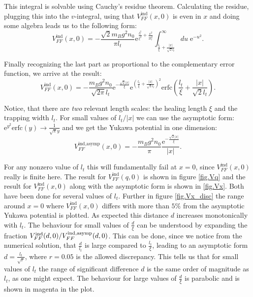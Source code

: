 This integral is solvable using Cauchy's residue theorem. Calculating the residue, plugging this into the $v$-integral, using that $V_{FF}^\text{ind}(x,0)$ is even in $x$ and doing some algebra leads us to the following form:
\begin{equation}
V_{FF}^\text{ind}(x,0) = -\frac{\sqrt{2}m_Bg^2n_0}{\pi l_t}\text{e}^{\frac{l_t^2}{\xi^2}+\frac{x^2}{2l_t^2}}\int_{\frac{l_t}{\xi}+\frac{|x|}{\sqrt{2}l_t}}^\infty du \; \text{e}^{-u^2}. \nonumber
\end{equation}

Finally recognizing the last part as proportional to the complementary error function, we arrive at the result:
\begin{equation}
V_{FF}^\text{ind}(x,0) = -\frac{m_Bg^2n_0}{\sqrt{2\pi} l_t} \text{e}^{-\frac{\sqrt{2}|x|}{\xi}}\text{e}^{\left(\frac{l_t}{\xi}+\frac{|x|}{\sqrt{2}l_t}\right)^2}\text{erfc}\left(\frac{l_t}{\xi}+\frac{|x|}{\sqrt{2}l_t}\right).
\end{equation}

Notice, that there are \textit{two} relevant length scales: the healing length $\xi$ and the trapping width $l_t$. For small values of $l_t/|x|$ we can use the asymptotic form: $\text{e}^{y^2}\text{erfc}(y) \to \frac{1}{\sqrt{\pi}y}$ and we get the Yukawa potential in one dimension:
\begin{equation}
V_{FF}^\text{ind,asymp}(x,0) = -\frac{m_Bg^2n_0}{\pi}\frac{\text{e}^{-\frac{\sqrt{2}|x|}{\xi}}}{|x|}.
\label{eq.Vx_asymp}
\end{equation}

For any nonzero value of $l_t$ this will fundamentally fail at $x=0$, since $V_{FF}^\text{ind}(x,0)$ really is finite here. The result for $V_{FF}^\text{ind}(q,0)$ is shown in figure \ref{fig.Vq} and the result for $V_{FF}^\text{ind}(x,0)$ along with the asymptotic form is shown in \ref{fig.Vx}. Both have been done for several values of $l_t$. Further in figure \ref{fig.Vx_disc} the range around $x=0$ where $V_{FF}^\text{ind}(x,0)$ differs with more than $5\%$ from the asymptotic Yukawa potential is plotted. As expected this distance $d$ increases monotonically with $l_t$. The behaviour for small values of $\frac{d}{\xi}$ can be understood by expanding the fraction $V_{FF}^\text{ind}(d,0)/V_{FF}^\text{ind,\text{asymp}}(d,0)$. This can be done, since we notice from the numerical solution, that $\frac{d}{l_t}$ is large compared to $\frac{l_t}{\xi}$, leading to an asymptotic form $d = \frac{l_t}{\sqrt{r}}$, where $r=0.05$ is the allowed discrepancy. This tells us that for small values of $l_t$ the range of significant difference $d$ is the same order of magnitude as $l_t$, as one might expect. The behaviour for large values of $\frac{d}{\xi}$ is parabolic and is shown in magenta in the plot.  

